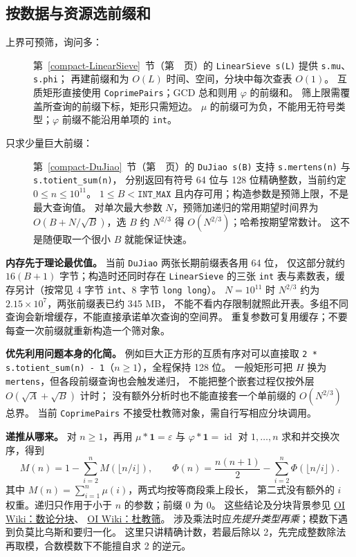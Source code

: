 \subsection{按数据与资源选前缀和}
\begin{description}
\item[上界可预筛，询问多：]
第~\ref{compact-LinearSieve}~节（第~\pageref{compact-LinearSieve}~页）的
\texttt{LinearSieve s(L)} 提供 \texttt{s.mu}、\texttt{s.phi}；
再建前缀和为 $O(L)$ 时间、空间，分块中每次查表 $O(1)$。
互质矩形直接使用 \texttt{CoprimePairs}；GCD 总和则用 $\varphi$ 的前缀和。
筛上限需覆盖所查询的前缀下标，矩形只需短边。
$\mu$ 的前缀可为负，不能用无符号类型；$\varphi$ 前缀不能沿用单项的 \texttt{int}。
\item[只求少量巨大前缀：]
第~\ref{compact-DuJiao}~节（第~\pageref{compact-DuJiao}~页）的
\texttt{DuJiao s(B)} 支持 \texttt{s.mertens(n)} 与 \texttt{s.totient\_sum(n)}，
分别返回有符号 64 位与 128 位精确整数，当前约定 $0\le n\le10^{11}$。
$1\le B<\texttt{INT\_MAX}$ 且内存可用；构造参数是预筛上限，不是最大查询值。
对单次最大参数 $N$，预筛加递归的常用期望时间界为
$O(B+N/\sqrt B)$，选 $B$ 约 $N^{2/3}$ 得 $O(N^{2/3})$；哈希按期望常数计。
这不是随便取一个很小 $B$ 就能保证快速。
\end{description}

\textbf{内存先于理论最优值。} 当前 \texttt{DuJiao} 两张长期前缀表各用 64 位，
仅这部分就约 $16(B+1)$ 字节；构造时还同时存在 \texttt{LinearSieve} 的三张
\texttt{int} 表与素数表，缓存另计（按常见 4 字节 \texttt{int}、8 字节 \texttt{long long}）。
$N=10^{11}$ 时 $N^{2/3}$ 约为 $2.15\times10^7$，两张前缀表已约 345 MB，
不能不看内存限制就照此开表。多组不同查询会新增缓存，不能直接承诺单次查询的空间界。
重复参数可复用缓存；不要每查一次前缀就重新构造一个筛对象。

\textbf{优先利用问题本身的化简。} 例如巨大正方形的互质有序对可以直接取
\texttt{2 * s.totient\_sum(n) - 1}（$n\ge1$），全程保持 128 位。
一般矩形可把 $H$ 换为 \texttt{mertens}，但各段前缀查询也会触发递归，
不能把整个嵌套过程仅按外层 $O(\sqrt A+\sqrt B)$ 计时；
没有额外分析时也不能直接套一个单前缀的 $O(N^{2/3})$ 总界。
当前 \texttt{CoprimePairs} 不接受杜教筛对象，需自行写相应分块调用。

\textbf{递推从哪来。} 对 $n\ge1$，再用 $\mu*\mathbf1=\varepsilon$ 与
$\varphi*\mathbf1=\operatorname{id}$ 对 $1,\ldots,n$ 求和并交换次序，得到
\[
M(n)=1-\sum_{i=2}^{n}M(\lfloor n/i\rfloor),\qquad
\Phi(n)=\frac{n(n+1)}2-\sum_{i=2}^{n}\Phi(\lfloor n/i\rfloor).
\]
其中 $M(n)=\sum_{i=1}^n\mu(i)$，两式均按等商段乘上段长，
第二式没有额外的 $i$ 权重。递归只作用于小于 $n$ 的参数；前缀 0 为 0。
这些结论及分块背景参见
\href{https://oi-wiki.org/math/number-theory/sqrt-decomposition/}{OI Wiki：数论分块}、
\href{https://next.oi-wiki.org/math/number-theory/du/}{OI Wiki：杜教筛}。
涉及乘法时应\emph{先提升类型再乘}；模数下遇到负莫比乌斯和要归一化。
这里只讲精确计数，若最后除以 2，先完成整数除法再取模，合数模数下不能擅自求 2 的逆元。
